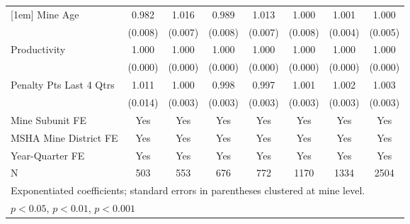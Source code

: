 {\begin{tabular}{l*{7}{c}}
[1em]
Mine Age                 &       0.982\sym{*}  &       1.016\sym{*}  &       0.989         &       1.013         &       1.000         &       1.001         &       1.000         \\
                         &     (0.008)         &     (0.007)         &     (0.008)         &     (0.007)         &     (0.008)         &     (0.004)         &     (0.005)         \\
[1em]
Productivity             &       1.000         &       1.000         &       1.000\sym{*}  &       1.000         &       1.000         &       1.000         &       1.000         \\
                         &     (0.000)         &     (0.000)         &     (0.000)         &     (0.000)         &     (0.000)         &     (0.000)         &     (0.000)         \\
[1em]
Penalty Pts Last 4 Qtrs  &       1.011         &       1.000         &       0.998         &       0.997         &       1.001         &       1.002         &       1.003         \\
                         &     (0.014)         &     (0.003)         &     (0.003)         &     (0.003)         &     (0.003)         &     (0.003)         &     (0.003)         \\
[1em]
Mine Subunit FE          &         Yes         &         Yes         &         Yes         &         Yes         &         Yes         &         Yes         &         Yes         \\
[1em]
MSHA Mine District FE    &         Yes         &         Yes         &         Yes         &         Yes         &         Yes         &         Yes         &         Yes         \\
[1em]
Year-Quarter FE          &         Yes         &         Yes         &         Yes         &         Yes         &         Yes         &         Yes         &         Yes         \\
\hline
N                        &         503         &         553         &         676         &         772         &        1170         &        1334         &        2504         \\
\hline\hline
\multicolumn{8}{l}{\footnotesize Exponentiated coefficients; standard errors in parentheses clustered at mine level.}\\
\multicolumn{8}{l}{\footnotesize \sym{*} \(p<0.05\), \sym{**} \(p<0.01\), \sym{***} \(p<0.001\)}\\
\end{tabular}
}

